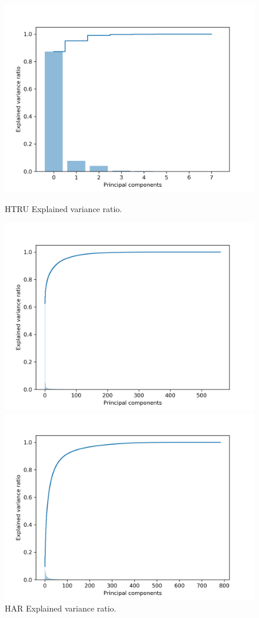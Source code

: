 \documentclass[journal]{IEEEtran}
\begin{document}
\begin{figure}[!htb]
    \includegraphics[width=\linewidth]{images/pulsarpca.png}
    \caption{HTRU Explained variance ratio.}\label{fig_pulsarpca}
  \endminipage\hfill
    \includegraphics[width=\linewidth]{images/harpca.png}
    \caption{HAR Explained variance ratio.}\label{fig_harpca}
  \endminipage\hfill
    \includegraphics[width=\linewidth]{images/mnistpca.png}

\end{figure}
\end{document}
